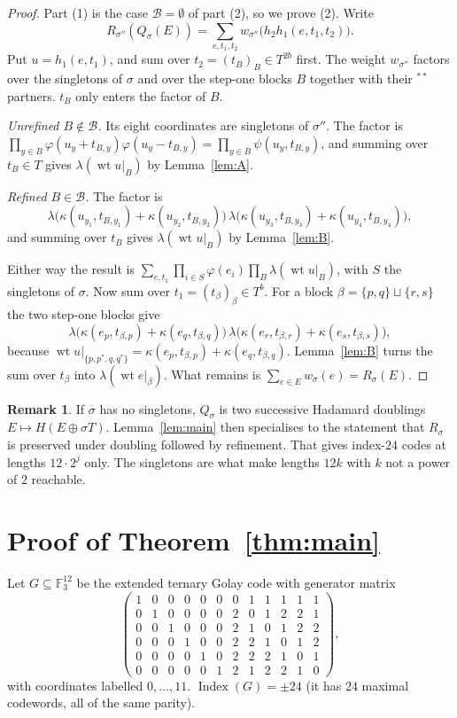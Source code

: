 \documentclass[11pt]{amsart}
\theoremstyle{definition}
\newtheorem{remark}[theorem]{Remark}
\newcommand{\F}{\mathbb{F}_3}
\newcommand{\wt}{\operatorname{wt}}
\newcommand{\Index}{\operatorname{Index}}
\begin{document}
\begin{proof}
Part (1) is the case $\mathcal B=\emptyset$ of part (2), so we prove (2). Write
\[
  R_{\sigma''}(Q_\sigma(E))=\sum_{e,t_1,t_2}w_{\sigma''}\bigl(h_2h_1(e,t_1,t_2)\bigr).
\]
Put $u=h_1(e,t_1)$, and sum
over $t_2=(t_B)_B\in T^{2b}$ first. The weight $w_{\sigma''}$ factors over the singletons of $\sigma$
and over the step-one blocks $B$ together with their $^{**}$ partners. $t_B$ only enters the factor of $B$.

\emph{Unrefined $B\notin\mathcal B$.} Its eight coordinates are singletons of $\sigma''$. The
factor is $\prod_{y\in B}\varphi(u_y+t_{B,y})\varphi(u_y-t_{B,y})=\prod_{y\in B}\psi(u_y,t_{B,y})$,
and summing over $t_B\in T$ gives $\lambda(\wt u|_B)$ by Lemma~\ref{lem:A}.

\emph{Refined $B\in\mathcal B$.} The factor is
\[
\lambda\bigl(\kappa(u_{y_1},t_{B,y_1})+\kappa(u_{y_2},t_{B,y_2})\bigr)\,
\lambda\bigl(\kappa(u_{y_3},t_{B,y_3})+\kappa(u_{y_4},t_{B,y_4})\bigr),
\]
and summing over $t_B$ gives
$\lambda(\wt u|_B)$ by Lemma~\ref{lem:B}.

Either way the result is $\sum_{e,t_1}\prod_{i\in S}\varphi(e_i)\prod_B\lambda(\wt u|_B)$, with
$S$ the singletons of $\sigma$. Now sum over $t_1=(t_\beta)_\beta\in T^b$. For a block
$\beta=\{p,q\}\sqcup\{r,s\}$ the two step-one blocks give
\[
\lambda\bigl(\kappa(e_p,t_{\beta,p})+\kappa(e_q,t_{\beta,q})\bigr)\,\lambda\bigl(\kappa(e_r,t_{\beta,r})+\kappa(e_s,t_{\beta,s})\bigr),
\]
because $\wt u|_{\{p,p^*,q,q^*\}}=\kappa(e_p,t_{\beta,p})+\kappa(e_q,t_{\beta,q})$.
Lemma~\ref{lem:B} turns the sum over $t_\beta$ into $\lambda(\wt e|_\beta)$. What remains is
$\sum_{e\in E}w_\sigma(e)=R_\sigma(E)$.
\end{proof}

\begin{remark}
If $\sigma$ has no singletons, $Q_\sigma$ is two successive Hadamard doublings
$E\mapsto H(E\oplus\sigma T)$. Lemma~\ref{lem:main} then specialises to the statement that
$R_\sigma$ is preserved under doubling followed by refinement. That gives index-$24$ codes at
lengths $12\cdot2^j$ only. The singletons are what make lengths $12k$ with $k$ not a power of $2$
reachable.
\end{remark}

\section{Proof of Theorem~\ref{thm:main}}

Let $G\subseteq\F^{12}$ be the extended ternary Golay code \cite{CS} with generator matrix
\[
\begin{pmatrix}
1&0&0&0&0&0&0&1&1&1&1&1\\
0&1&0&0&0&0&2&0&1&2&2&1\\
0&0&1&0&0&0&2&1&0&1&2&2\\
0&0&0&1&0&0&2&2&1&0&1&2\\
0&0&0&0&1&0&2&2&2&1&0&1\\
0&0&0&0&0&1&2&1&2&2&1&0
\end{pmatrix},
\]
with coordinates labelled $0,\dots,11$. $\Index(G)=\pm24$ (it has $24$ maximal codewords, all of the same parity).
\end{document}
